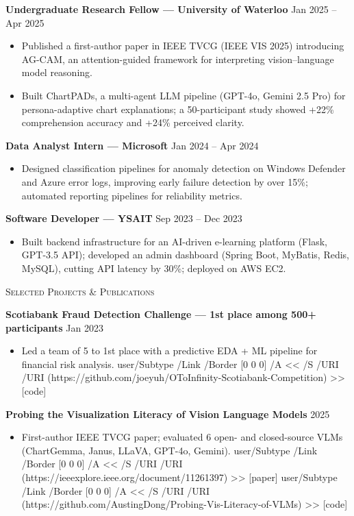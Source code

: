\documentclass[10pt]{article}
\newcommand{\href}[2]{%
  \leavevmode
  \pdfstartlink user{/Subtype /Link /Border [0 0 0] /A << /S /URI /URI (#1) >>}%
  \textcolor{accent}{#2}%
  \pdfendlink}
\newcommand{\cvsection}[1]{%
  \par\vspace{0.75em}%
  {\noindent\normalsize\scshape\color{accent}#1\par}%
  \vspace{-0.6em}\noindent{\color{rulegray}\rule{\textwidth}{0.6pt}}\par
  \vspace{0.2em}%
}
\newcommand{\entry}[2]{\noindent\textbf{#1} \hfill {\small\color{mutedgray}#2}\par}
\begin{document}
\vspace{0.3em}
\entry{Undergraduate Research Fellow --- University of Waterloo}{Jan 2025 -- Apr 2025}
\begin{itemize}
  \item Published a first-author paper in IEEE TVCG (IEEE VIS 2025) introducing AG-CAM, an attention-guided framework for interpreting vision--language model reasoning.
  \item Built ChartPADs, a multi-agent LLM pipeline (GPT-4o, Gemini 2.5 Pro) for persona-adaptive chart explanations; a 50-participant study showed +22\% comprehension accuracy and +24\% perceived clarity.
\end{itemize}

\vspace{0.3em}
\entry{Data Analyst Intern --- Microsoft}{Jan 2024 -- Apr 2024}
\begin{itemize}
  \item Designed classification pipelines for anomaly detection on Windows Defender and Azure error logs, improving early failure detection by over 15\%; automated reporting pipelines for reliability metrics.
\end{itemize}

\vspace{0.3em}
\entry{Software Developer --- YSAIT}{Sep 2023 -- Dec 2023}
\begin{itemize}
  \item Built backend infrastructure for an AI-driven e-learning platform (Flask, GPT-3.5 API); developed an admin dashboard (Spring Boot, MyBatis, Redis, MySQL), cutting API latency by 30\%; deployed on AWS EC2.
\end{itemize}

\cvsection{Selected Projects \& Publications}
\entry{Scotiabank Fraud Detection Challenge --- 1st place among 500+ participants}{Jan 2023}
\begin{itemize}
  \item Led a team of 5 to 1st place with a predictive EDA + ML pipeline for financial risk analysis. \href{https://github.com/joeyuh/OToInfinity-Scotiabank-Competition}{[code]}
\end{itemize}

\vspace{0.3em}
\entry{Probing the Visualization Literacy of Vision Language Models}{2025}
\begin{itemize}
  \item First-author IEEE TVCG paper; evaluated 6 open- and closed-source VLMs (ChartGemma, Janus, LLaVA, GPT-4o, Gemini). \href{https://ieeexplore.ieee.org/document/11261397}{[paper]} \href{https://github.com/AustingDong/Probing-Vis-Literacy-of-VLMs}{[code]}
\end{itemize}
\end{document}

